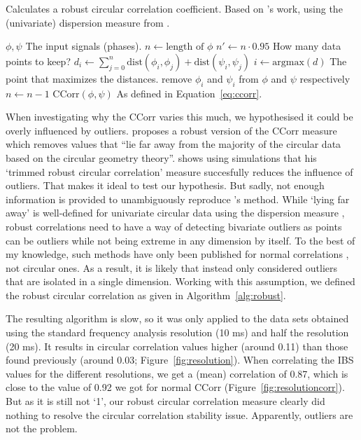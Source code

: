 \begin{algorithm}[!htpb]
  \caption{Calculates a robust circular correlation coefficient. Based on \textcite{mahmood_robust_2022}'s work, using the (univariate) dispersion measure from \textcite[p.~28]{pewsey_circular_2013}.}
  \begin{algorithmic}
  \Require $\phi, \psi$ \Comment The input signals (phases).
  \State $n \gets \text{length of }\phi$
  \State $n' \gets n \cdot 0.95$ \Comment How many data points to keep?
      \State $d_i \gets \sum\limits_{j = 0}^n \text{dist}(\phi_i, \phi_j) + \text{dist}(\psi_i, \psi_j)$
    \EndFor
    \State $i \gets \text{argmax}(d)$ \Comment The point that maximizes the distances.
    \State remove $\phi_i$ and $\psi_i$ from $\phi$ and $\psi$ respectively
    \State $n \gets n - 1$
   \EndWhile
   \State\Return $\text{CCorr}(\phi, \psi)$ \Comment As defined in Equation~\ref{eq:ccorr}.
  \end{algorithmic}
  \label{alg:robust}
\end{algorithm}

When investigating why the CCorr varies this much, we
hypothesised it could be overly influenced by outliers.
\textcite{mahmood_robust_2022} proposes a robust version of the CCorr measure
which removes values that ``lie far away from the majority of the circular data
based on the circular geometry theory''.
\citeauthor{mahmood_robust_2022} shows using simulations that his `trimmed
robust circular correlation' measure succesfully reduces the influence of
outliers. That makes it ideal to test our hypothesis. But sadly, not enough
information is provided to unambiguously reproduce
\citeauthor{mahmood_robust_2022}'s method. While `lying far away' is
well-defined for univariate circular data using the dispersion measure
\parencite[p.~26]{pewsey_circular_2013}, robust correlations need to have a way
of detecting bivariate outliers \parencite[p.~12]{maronna_robust_2019} as points
can be outliers while not being extreme in any dimension by itself. To the best
of my knowledge, such methods have only been published for normal correlations
\parencite[chapter~6]{bebbington_method_1978,shevlyakov_robust_2010,maronna_robust_2019}, not circular ones.
As a result, it is likely that \citeauthor{mahmood_robust_2022} instead only
considered outliers that are isolated in a single dimension. Working with this
assumption, we defined the robust circular correlation as given in
Algorithm~\ref{alg:robust}.

The resulting algorithm is slow, so it was only applied to the data sets
obtained using the standard frequency analysis resolution (10 ms) and half the
resolution (20 ms). It results in circular correlation values higher (around
0.11) than those found previously (around 0.03; Figure~\ref{fig:resolution}).
When correlating the IBS values for the different resolutions, we get a (mean)
correlation of 0.87, which is close to the value of 0.92 we got for normal
CCorr (Figure~\ref{fig:resolutioncorr}). But as it is still not
`1', our robust circular correlation measure clearly did nothing to resolve the
circular correlation stability issue. Apparently, outliers are not the problem.

